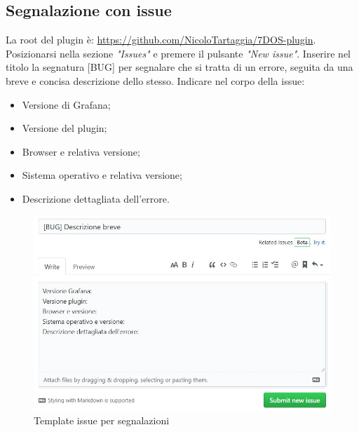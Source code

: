\subsection{Segnalazione con issue}
La root del plugin è: \url{https://github.com/NicoloTartaggia/7DOS-plugin}. \\
Posizionarsi nella sezione \emph{"Issues"} e premere il pulsante \emph{"New issue"}. Inserire nel titolo la segnatura [BUG] per segnalare che si tratta di un errore, seguita da una breve e concisa descrizione dello stesso.
Indicare nel corpo della issue:
\begin{itemize}
	\item Versione di Grafana;
	\item Versione del plugin;
	\item Browser e relativa versione;
	\item Sistema operativo e relativa versione;
	\item Descrizione dettagliata dell'errore.
\end{itemize}
\begin{figure} [H]
	\centering
	\includegraphics[scale=0.9]{Img/issue.jpg} 
	\caption{Template issue per segnalazioni} \label{} 
\end{figure} 

\newpage